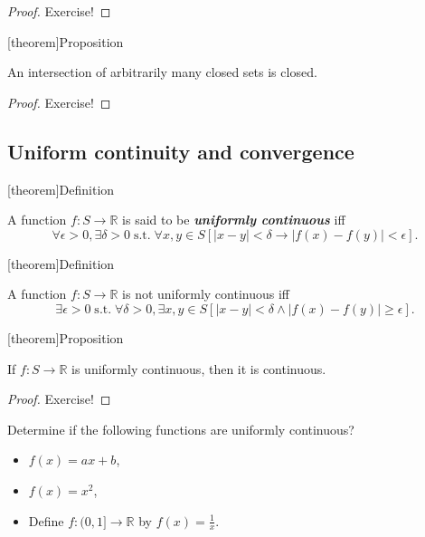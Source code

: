 \documentclass[12pt]{report}
\theoremstyle{definition}
\begin{document}
\begin{proof}
    Exercise!
\end{proof} 

[theorem]{Proposition}
\begin{intersection of closed sets is closed}
    An intersection of arbitrarily many closed sets is closed.
\end{intersection of closed sets is closed}

\begin{proof}
    Exercise!
\end{proof} 


\subsection{Uniform continuity and convergence}

[theorem]{Definition}
\begin{uniformly continuous}
    A function $f:S\rightarrow\mathbb{R}$ is said to be \textbf{\emph{uniformly
    continuous}} iff \[
        \forall \epsilon > 0, \exists \delta > 0 \;\text{s.t.}\;
        \forall x,y\in S [|x-y|<\delta \rightarrow |f(x)-f(y)|<\epsilon].
    \]
\end{uniformly continuous}

[theorem]{Definition}
\begin{not uniformly continuous}
    A function $f:S\rightarrow\mathbb{R}$ is not uniformly continuous iff \[
        \exists \epsilon > 0 \;\text{s.t.}\; \forall \delta > 0,
        \exists x,y\in S [|x-y|<\delta \wedge |f(x)-f(y)|\ge\epsilon].
    \]
\end{not uniformly continuous}


[theorem]{Proposition}
\begin{uniformly continuous is continuous}
    If $f:S\rightarrow\mathbb{R}$ is uniformly continuous, 
    then it is continuous.
\end{uniformly continuous is continuous}

\begin{proof}
    Exercise!
\end{proof} 

\begin{ex}
    Determine if the following functions are uniformly continuous?
    \begin{itemize}
        \item $f(x) = ax + b$,
        \item $f(x) = x^{2}$,
        \item Define $f:(0,1]\rightarrow\mathbb{R}$ by %
            $f(x) = \frac{1}{x}$.
    \end{itemize} 
\end{ex} 
\end{document}
